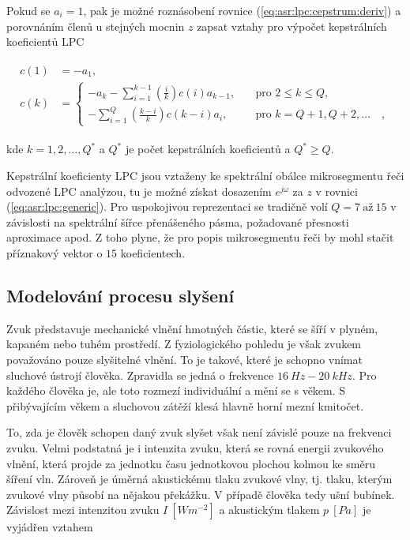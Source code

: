 \noindent Pokud se $a_i = 1$, pak je možné roznásobení rovnice (\ref{eq:asr:lpc:cepstrum:deriv}) a porovnáním členů u stejných mocnin $z$ zapsat vztahy pro výpočet kepstrálních koeficientů LPC

\begin{align}
  \begin{split}
    c(1) &= -a_1, \\
    c(k) &=
    \begin{cases}
      - a_k - \sum_{i=1}^{k-1} \left(\frac{i}{k}\right) c(i) a_{k-1},  & \quad \text{pro } 2 \leq k \leq Q, \\
      - \sum_{i=1}^{Q} \left(\frac{k - i}{k}\right) c(k-i) a_i,  & \quad \text{pro } k = Q + 1, Q + 2, \dots \quad ,
    \end{cases}
  \end{split}
  \label{eq:asr:lpc:cepstrum:coef}
\end{align}

\noindent kde $k = 1, 2, \dots , Q^{*}$ a $Q^{*}$ je počet kepstrálních koeficientů a $Q^{*} \geq Q$.

Kepstrální koeficienty LPC jsou vztaženy ke spektrální obálce mikrosegmentu řeči odvozené LPC analýzou, tu je možné získat dosazením $e^{j\omega}$ za $z$ v rovnici (\ref{eq:asr:lpc:generic}). Pro uspokojivou reprezentaci se tradičně volí $Q = 7\ \text{až}\ 15$ v závislosti na spektrální šířce přenášeného pásma, požadované přesnosti aproximace apod. Z toho plyne, že pro popis mikrosegmentu řeči by mohl stačit příznakový vektor o $15$ koeficientech.

\subsection{Modelování procesu slyšení}
\label{chap:asr:parametrization:hearing}

Zvuk představuje mechanické vlnění hmotných částic, které se šíří v plyném, kapaném nebo tuhém prostředí. Z fyziologického pohledu je však zvukem považováno pouze slyšitelné vlnění. To je takové, které je schopno vnímat sluchové ústrojí člověka. Zpravidla se jedná o frekvence $16\ Hz - 20\ kHz$. Pro každého člověka je, ale toto rozmezí individuální a mění se s věkem. S přibývajícím věkem a sluchovou zátěží klesá hlavně horní mezní kmitočet. \cite{Psutka2006}

To, zda je člověk schopen daný zvuk slyšet však není závislé pouze na frekvenci zvuku. Velmi podstatná je i intenzita zvuku, která se rovná energii zvukového vlnění, která projde za jednotku času jednotkovou plochou kolmou ke směru šíření vln. Zároveň je úměrná akustickému tlaku zvukové vlny, tj. tlaku, kterým zvukové vlny působí na nějakou překážku. V případě člověka tedy ušní bubínek. Závislost mezi intenzitou zvuku $I\ \left[Wm^{-2}\right]$ a akustickým tlakem $p\ \left[Pa\right]$ je vyjádřen vztahem

